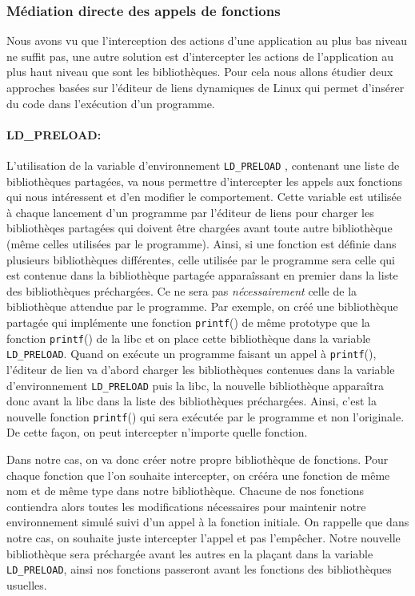 \subsubsection{Médiation directe des appels de fonctions}

Nous avons vu que l'interception des actions d'une application au plus bas
niveau ne suffit pas, une autre solution est d'intercepter les actions de
l'application au plus haut niveau que sont les bibliothèques. Pour cela nous
allons étudier deux approches basées sur l'éditeur de liens dynamiques de Linux
qui permet d'insérer du code dans l'exécution d'un programme.

\paragraph{LD\_PRELOAD:}
\label{paragraphe:LDPreload}

L'utilisation de la variable d'environnement \texttt{LD\_PRELOAD}
\citep{LDPreload}, contenant une liste de bibliothèques partagées, va nous
permettre d'intercepter les appels aux fonctions qui nous intéressent et d'en
modifier le comportement. Cette variable est utilisée à chaque lancement d'un
programme par l'éditeur de liens pour charger les bibliothèqes partagées qui
doivent être chargées avant toute autre bibliothèque (même celles utilisées par
le programme). Ainsi, si une fonction est définie dans plusieurs bibliothèques
différentes, celle utilisée par le programme sera celle qui est contenue dans la
bibliothèque partagée apparaîssant en premier dans la liste des bibliothèques
préchargées. Ce ne sera pas \textit{nécessairement} celle de la bibliothèque
attendue par le programme. Par exemple, on créé une bibliothèque partagée qui
implémente une fonction \texttt{printf}() de même prototype que la
fonction \texttt{printf}() de la libc et on place cette bibliothèque dans la
variable \texttt{LD\_PRELOAD}. Quand on exécute un programme faisant un appel
à \texttt{printf}(), l'éditeur de lien va d'abord charger les bibliothèques
contenues dans la variable d'environnement \texttt{LD\_PRELOAD} puis la libc, la
nouvelle bibliothèque apparaîtra donc avant la libc dans la liste des
bibliothèques préchargées. Ainsi, c'est la nouvelle fonction \texttt{printf}()
qui sera exécutée par le programme et non l'originale. De cette façon, on peut
intercepter n'importe quelle fonction.

Dans notre cas, on va donc créer notre propre bibliothèque de fonctions. Pour
chaque fonction que l'on souhaite intercepter, on crééra une
fonction de même nom et de même type dans notre bibliothèque. Chacune de nos
fonctions contiendra alors toutes les modifications nécessaires pour maintenir
notre environnement simulé suivi d'un appel à la fonction initiale. On rappelle
que dans notre cas, on souhaite juste intercepter l'appel et pas l'empêcher. Notre nouvelle bibliothèque sera préchargée avant les autres en la plaçant dans
la variable \texttt{LD\_PRELOAD}, ainsi nos fonctions passeront avant les
fonctions des bibliothèques usuelles.

